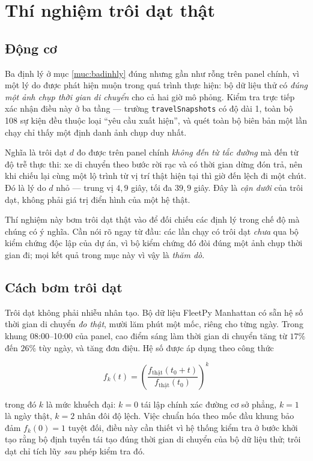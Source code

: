 \section{Thí nghiệm trôi dạt thật}
\label{muc:troidat}

\subsection{Động cơ}

Ba định lý ở mục \ref{muc:badinhly} đúng nhưng gần như rỗng trên panel chính, vì một lý do được
phát hiện muộn
trong quá trình thực hiện: bộ dữ liệu thử có \emph{đúng một ảnh chụp thời gian di chuyển} cho cả
hai giờ mô phỏng. Kiểm tra trực tiếp xác nhận điều này ở ba tầng --- trường
\texttt{travelSnapshots} có độ dài 1, toàn bộ 108 sự kiện đều thuộc loại ``yêu cầu xuất hiện'',
và quét toàn bộ biên bản một lần chạy chỉ thấy một định danh ảnh chụp duy nhất.

Nghĩa là trôi dạt $d$ đo được trên panel chính \emph{không đến từ tắc đường} mà đến từ độ trễ
thực thi: xe di chuyển theo bước rời rạc và có thời gian dừng đón trả, nên khi chiếu lại cùng
một lộ trình từ vị trí thật hiện tại thì giờ đến lệch đi một chút. Đó là lý do $d$ nhỏ --- trung
vị $4{,}9$ giây, tối đa $39{,}9$ giây. Đây là \emph{cận dưới} của trôi dạt, không phải giá trị
điển hình của một hệ thật.

Thí nghiệm này bơm trôi dạt thật vào để đối chiếu các định lý trong chế độ mà chúng có ý nghĩa.
Cần nói rõ ngay từ đầu: các lần chạy có trôi dạt \emph{chưa} qua bộ kiểm chứng độc lập của dự án,
vì bộ kiểm chứng đó đòi đúng một ảnh chụp thời gian đi; mọi kết quả trong mục này vì vậy là
\emph{thăm dò}.

\subsection{Cách bơm trôi dạt}

Trôi dạt không phải nhiễu nhân tạo. Bộ dữ liệu FleetPy Manhattan có sẵn hệ số thời gian di
chuyển \emph{đo thật}, mười lăm phút một mốc, riêng cho từng ngày. Trong khung 08:00--10:00 của
panel, cao điểm sáng làm thời gian di chuyển tăng từ $17\%$ đến $26\%$ tùy ngày, và tăng đơn
điệu. Hệ số được áp dụng theo công thức

\begin{equation}
f_k(t) = \left( \frac{f_{\text{thật}}(t_0 + t)}{f_{\text{thật}}(t_0)} \right)^{k}
\end{equation}

trong đó $k$ là mức khuếch đại: $k=0$ tái lập chính xác đường cơ sở phẳng, $k=1$ là ngày thật,
$k=2$ nhân đôi độ lệch. Việc chuẩn hóa theo mốc đầu khung bảo đảm $f_k(0) = 1$ tuyệt đối, điều
này cần thiết vì hệ thống kiểm tra ở bước khởi tạo rằng bộ định tuyến tái tạo đúng thời gian di
chuyển của bộ dữ liệu thử; trôi dạt chỉ tích lũy \emph{sau} phép kiểm tra đó.

